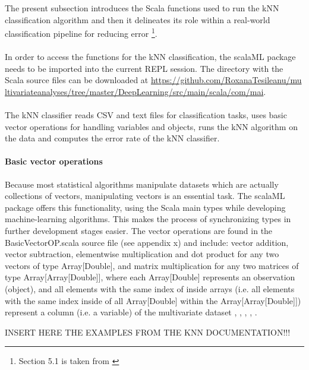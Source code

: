 \documentclass {article}
\begin{document}
The present subsection introduces the Scala functions used to run the kNN classification algorithm and then it delineates its role within a real-world classification pipeline for reducing error \footnote {Section 5.1 is taken from \cite{tesileanu_introduction_2017}}.
\\
\\
In order to access the functions for the kNN classification, the scalaML package needs to be imported into the current REPL session. The directory with the Scala source files can be downloaded at \href{https://github.com/RoxanaTesileanu/multivariate_analyses/tree/master/DeepLearning/src/main/scala/com/mai}{https://github.com/RoxanaTesileanu/mu\\ltivariate\underline{\space}analyses/tree/master/DeepLearning/src/main/scala/com/mai}.
\\
\\
The kNN classifier reads CSV and text files for classification tasks, uses basic vector operations for handling variables and objects, runs the kNN algorithm on the data and computes the error rate of the kNN classifier.

\paragraph {Basic vector operations}

Because most statistical algorithms manipulate datasets which are actually collections of vectors, manipulating vectors is an essential task. The scalaML package offers this functionality, using the Scala main types while developing machine-learning algorithms. This makes the process of synchronizing types in further development stages easier.
 The vector operations are found in the BasicVectorOP.scala source file (see appendix x) and include: vector addition, vector subtraction, elementwise multiplication and dot product for any two vectors of type Array[Double], and matrix multiplication for any two matrices of type Array[Array[Double]], where each Array[Double] represents an observation (object), and all elements with the same index of inside arrays (i.e. all elements with the same index inside of all Array[Double] within the Array[Array[Double]]) represent a column (i.e. a variable) of the multivariate dataset \cite{dawkins_pauls_2005}, \cite{odersky_programming_2010}, \cite{swartz_learning_2015}, \cite{trask_grokking_2017}, \cite{epfl_scala_2017}.

INSERT HERE THE EXAMPLES FROM THE KNN DOCUMENTATION!!!
\end{document}
